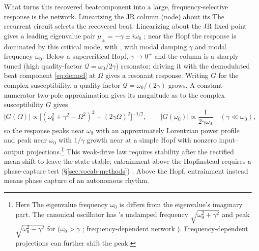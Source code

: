 \documentclass[11pt,a4paper]{article}
\providecommand{\DIFaddtex}[1]{{\protect\color{blue} \sf #1}} %
\providecommand{\DIFdeltex}[1]{{\protect\color{red} \scriptsize #1}} %
\providecommand{\DIFaddbegin}{} %
\providecommand{\DIFaddend}{} %
\providecommand{\DIFdelbegin}{} %
\providecommand{\DIFdelend}{} %
\providecommand{\DIFadd}[1]{\texorpdfstring{\DIFaddtex{#1}}{#1}} %
\providecommand{\DIFdel}[1]{\texorpdfstring{\DIFdeltex{#1}}{}} %
\begin{document}
\DIFdelbegin \DIFdel{What turns this recovered beatcomponent into a large, frequency-selective response is
the network. Linearizing the JR column (node) about its }\DIFdelend \DIFaddbegin \DIFadd{The recurrent circuit selects the recovered beat. Linearizing about the JR
}\DIFaddend fixed point gives a leading \DIFdelbegin \DIFdel{eigenvalue }\DIFdelend pair $\mu_\pm=-\gamma\pm i\omega_0$\DIFdelbegin \DIFdel{; near the Hopf the response is dominated by this critical
mode, with
}\DIFdelend \DIFaddbegin \DIFadd{, with
modal }\DIFaddend damping $\gamma$ and \DIFdelbegin \DIFdel{modal }\DIFdelend frequency $\omega_0$. Below a supercritical
Hopf, $\gamma\to0^+$ and the \DIFdelbegin \DIFdel{column is a sharply tuned (high quality-factor $\mathcal{Q}=\omega_0/2\gamma$) resonator;
driving it with the demodulated beat component
\eqref{eq:demod} at $\Omega$ gives a resonant response. Writing $G$ for the complex susceptibility, a }\DIFdelend \DIFaddbegin \DIFadd{quality factor
$\mathcal Q=\omega_0/(2\gamma)$ grows. A }\DIFaddend constant-numerator two-pole
approximation \DIFdelbegin \DIFdel{gives its magnitude as
}\DIFdelend \DIFaddbegin \DIFadd{to the complex susceptibility $G$ gives
}\DIFaddend \begin{equation}
|G(\Omega)|\propto\big[(\omega_0^2+\gamma^2-\Omega^2)^2+(2\gamma\Omega)^2\big]^{-1/2},
\qquad |G(\omega_0)|\propto\frac{1}{2\gamma\omega_0}
\quad(\gamma\ll\omega_0),
\label{eq:gain}
\end{equation}
\DIFdelbegin \DIFdel{so the response peaks near $\omega_0$ with }\DIFdelend an approximately Lorentzian power \DIFdelbegin \DIFdel{profile and }\DIFdelend \DIFaddbegin \DIFadd{peak near $\omega_0$ with }\DIFaddend $1/\gamma$
growth \DIFdelbegin \DIFdel{near }\DIFdelend \DIFaddbegin \DIFadd{at }\DIFaddend a simple Hopf with nonzero input--output projections.\footnote{\DIFdelbegin \DIFdel{Here }\DIFdelend
\DIFaddbegin \DIFadd{The eigenvalue frequency }\DIFaddend $\omega_0$ \DIFdelbegin \DIFdel{is }\DIFdelend \DIFaddbegin \DIFadd{differs from }\DIFaddend the \DIFdelbegin \DIFdel{eigenvalue's imaginary part. The
}\DIFdelend canonical oscillator\DIFdelbegin \DIFdel{has }\DIFdelend \DIFaddbegin \DIFadd{'s
}\DIFaddend undamped frequency $\sqrt{\omega_0^2+\gamma^2}$ and peak
$\sqrt{\omega_0^2-\gamma^2}$ \DIFdelbegin \DIFdel{for }\DIFdelend \DIFaddbegin \DIFadd{(}\DIFaddend $\omega_0>\gamma$\DIFdelbegin \DIFdel{; frequency-dependent
network }\DIFdelend \DIFaddbegin \DIFadd{).
Frequency-dependent }\DIFaddend projections can \DIFaddbegin \DIFadd{further }\DIFaddend shift the peak.}
This weak-drive law requires \DIFaddbegin \DIFadd{stability after }\DIFaddend the rectified mean shift\DIFdelbegin \DIFdel{to leave the state stable;
entrainment above the Hopfinstead requires a phase-capture test
(\S\ref{sec:vocab-methods})}\DIFdelend \DIFaddbegin \DIFadd{.
Above the Hopf, entrainment instead means phase capture of an autonomous rhythm}\DIFaddend .
\end{document}
